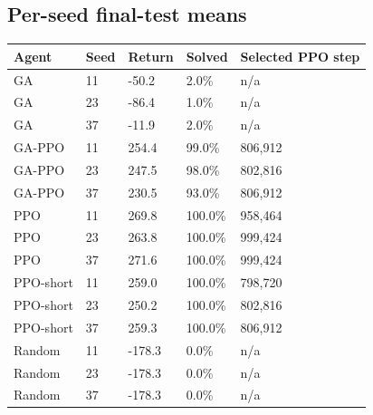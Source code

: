 \documentclass[11pt,a4paper]{article}
\begin{document}
\subsection*{Per-seed final-test means}
\begingroup\small
\begin{longtable}{p{}p{}p{}p{}p{}}
\toprule
Agent & Seed & Return & Solved & Selected PPO step \\
\midrule\endhead
GA & 11 & -50.2 & 2.0\% & n/a \\
GA & 23 & -86.4 & 1.0\% & n/a \\
GA & 37 & -11.9 & 2.0\% & n/a \\
GA-PPO & 11 & 254.4 & 99.0\% & 806,912 \\
GA-PPO & 23 & 247.5 & 98.0\% & 802,816 \\
GA-PPO & 37 & 230.5 & 93.0\% & 806,912 \\
PPO & 11 & 269.8 & 100.0\% & 958,464 \\
PPO & 23 & 263.8 & 100.0\% & 999,424 \\
PPO & 37 & 271.6 & 100.0\% & 999,424 \\
PPO-short & 11 & 259.0 & 100.0\% & 798,720 \\
PPO-short & 23 & 250.2 & 100.0\% & 802,816 \\
PPO-short & 37 & 259.3 & 100.0\% & 806,912 \\
Random & 11 & -178.3 & 0.0\% & n/a \\
Random & 23 & -178.3 & 0.0\% & n/a \\
Random & 37 & -178.3 & 0.0\% & n/a \\
\bottomrule\end{longtable}
\endgroup
\end{document}

